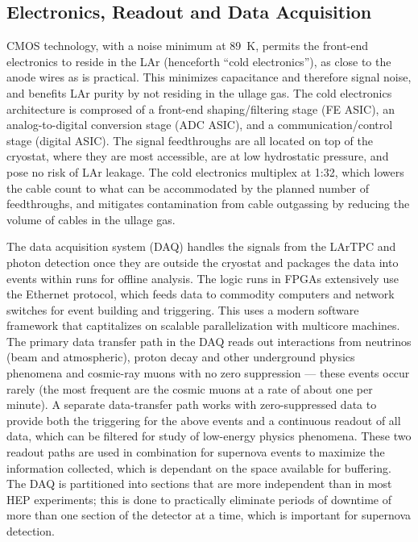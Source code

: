 \subsection{Electronics, Readout and Data Acquisition}
\label{sec:det_electronics}


CMOS technology, with a noise minimum at 89~K, permits the front-end electronics to reside in the LAr (henceforth ``cold electronics''), as close to the anode wires as is practical. This minimizes capacitance and therefore signal noise, and benefits LAr purity by not residing in the ullage gas. The cold electronics architecture is comprosed of a front-end shaping/filtering stage (FE ASIC), an analog-to-digital conversion stage (ADC ASIC), and a communication/control stage (digital ASIC). The signal feedthroughs are all located on top of the cryostat, where they are most accessible, are at low hydrostatic pressure, and pose no risk of LAr leakage. The cold electronics multiplex at 1:32, which lowers the cable count to what can be accommodated by the planned number of feedthroughs, and mitigates contamination from cable outgassing by reducing the volume of cables in the ullage gas.

The data acquisition system (DAQ) handles the signals from the LArTPC and photon detection once they are outside the cryostat and packages the data into events within runs for offline analysis.  The logic runs in FPGAs extensively use the Ethernet protocol, which feeds data to commodity computers and network switches  for event building and triggering. This uses a modern software framework that captitalizes on scalable parallelization with multicore machines. The primary data transfer path in the DAQ reads out interactions from neutrinos (beam and atmospheric), proton decay and other underground physics phenomena and cosmic-ray muons with no zero suppression --- these events occur rarely (the most frequent are the cosmic muons at a rate of about one per minute).  A separate data-transfer path works with zero-suppressed data to provide both the triggering for the above events and a continuous readout of all data, which can be filtered for study of low-energy physics phenomena.  These two readout paths are used in combination for supernova events to maximize the information collected, which is dependant on the %
space available for buffering.  The DAQ is partitioned into sections that are more independent than in most HEP experiments; this is done to %
practically eliminate periods of downtime of more than one section of the detector at a time, %
which is %
important for supernova detection.

